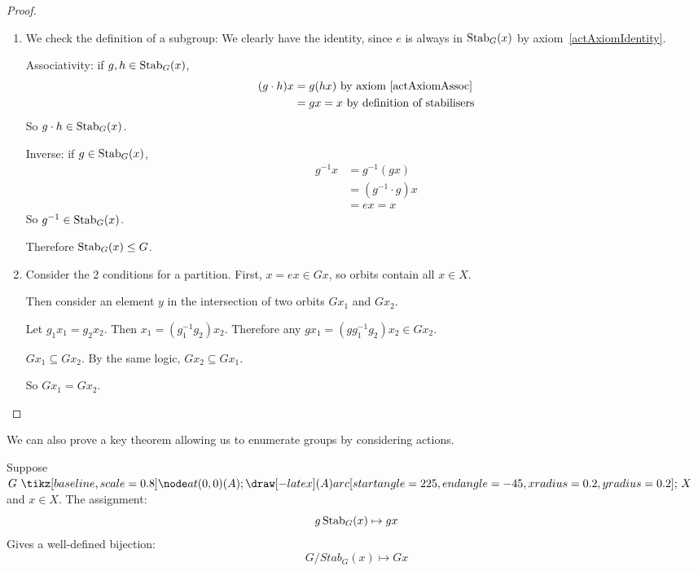 \documentclass[../Main.tex]{subfiles}
\begin{document}
\begin{proof}
    \begin{enumerate}
        \item We check the definition of a subgroup:
            We clearly have the identity, since $e$ is always in $\operatorname{Stab}_G(x)$ by axiom~\ref{actAxiomIdentity}.\par
            Associativity: if $g, h \in \operatorname{Stab}_G(x)$,
            \begin{align*}
                (g \cdot h)x &= g(hx) \text{ by axiom~\ref{actAxiomAssoc}} \\
                &= gx = x \text{ by definition of stabilisers}
            \end{align*}
            So $g \cdot h \in \operatorname{Stab}_G(x)$.\par
            Inverse: if $g \in \operatorname{Stab}_G(x)$,
            \begin{align*}
                g^{-1} x &= g^{-1} (gx) \\
                &= (g^{-1} \cdot g) x \\
                &= ex = x
            \end{align*}
            So $g^{-1} \in \operatorname{Stab}_G(x)$.\par
            Therefore $\operatorname{Stab}_G(x) \leq G$.
        \item Consider the 2 conditions for a partition.
            First, $x = ex \in Gx$, so orbits contain all $x \in X$.\par
            Then consider an element $y$ in the intersection of two orbits $Gx_1$ and $Gx_2$.\par
            Let $g_1 x_1 = g_2 x_2$. Then $x_1 = (g_1^{-1} g_2) x_2$. Therefore any $g x_1 = (g g_1^{-1} g_2) x_2 \in Gx_2$.\par
            $Gx_1 \subseteq Gx_2$. By the same logic, $G x_2 \subseteq G x_1$.\par
            So $G x_1 = G x_2$.
    \end{enumerate}
\end{proof}
We can also prove a key theorem allowing us to enumerate groups by considering actions.
\begin{theorem}
    Suppose $G \actson X$ and $x \in X$. The assignment:
    \begin{equation*}
        g \operatorname{Stab}_G(x) \mapsto gx
    \end{equation*}
    Gives a well-defined bijection:
    \begin{equation*}
        G / Stab_G(x) \mapsto Gx
    \end{equation*}
    \label{thmOrbitStab}
\end{theorem}
\end{document}

